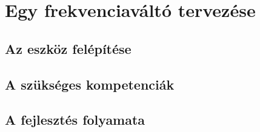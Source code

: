 \chapter{Egy frekvenciaváltó tervezése}
\section{Az eszköz felépítése}
\section{A szükséges kompetenciák}
\section{A fejlesztés folyamata}
